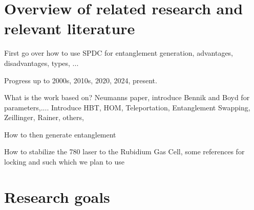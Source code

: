 \documentclass{article}
\theoremstyle{mytheoremstyle}
\theoremstyle{mytheoremstyle}
\theoremstyle{myproblemstyle}
\begin{document}

\section{Overview of related research and relevant literature}

First go over how to use SPDC for entanglement generation, advantages, disadvantages, types, ...

Progress up to 2000s, 2010s, 2020, 2024, present.

What is the work based on? Neumanns paper, introduce Bennik and Boyd for parameters,.... Introduce HBT, HOM, Teleportation, Entanglement Swapping, Zeillinger, Rainer, others,

How to then generate entanglement

How to stabilize the 780 laser to the Rubidium Gas Cell, some references for locking and such which we plan to use

\section{Research goals}
\end{document}
